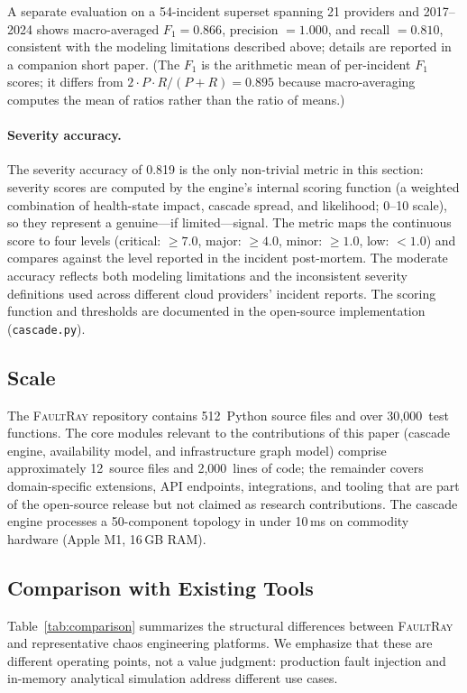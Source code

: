 \documentclass[10pt,twocolumn]{article}
\begin{document}
A separate evaluation on a 54-incident superset spanning 21 providers
and 2017--2024 shows macro-averaged $F_1 = 0.866$, precision $= 1.000$,
and recall $= 0.810$, consistent
with the modeling limitations described above; details are reported
in a companion short paper. (The $F_1$ is the arithmetic mean of
per-incident $F_1$ scores; it differs from
$2 \cdot P \cdot R / (P + R) = 0.895$ because macro-averaging
computes the mean of ratios rather than the ratio of means.)

\paragraph{Severity accuracy.}
The severity accuracy of 0.819 is the only non-trivial metric in
this section: severity scores are computed by the engine's internal
scoring function (a weighted combination of health-state impact,
cascade spread, and likelihood; 0--10 scale), so they represent
a genuine---if limited---signal. The metric maps the continuous score to four levels
(critical: $\ge 7.0$, major: $\ge 4.0$, minor: $\ge 1.0$,
low: $< 1.0$) and compares against the level reported in
the incident post-mortem. The moderate accuracy
reflects both modeling limitations and the inconsistent severity
definitions used across different cloud providers' incident
reports. The scoring function and thresholds are documented
in the open-source implementation (\texttt{cascade.py}).

\subsection{Scale}
The \textsc{FaultRay} repository contains 512~Python source files
and over 30{,}000~test functions. The core modules relevant to the
contributions of this paper (cascade engine, availability model,
and infrastructure graph model) comprise approximately 12~source
files and 2{,}000~lines of code; the remainder covers domain-specific
extensions, API endpoints, integrations, and tooling that are part
of the open-source release but not claimed as research contributions.
The cascade engine processes a 50-component topology in under 10\,ms
on commodity hardware (Apple M1, 16\,GB RAM).

\subsection{Comparison with Existing Tools}

Table~\ref{tab:comparison} summarizes the structural differences
between \textsc{FaultRay} and representative chaos engineering
platforms. We emphasize that these are different operating
points, not a value judgment: production fault injection and
in-memory analytical simulation address different use cases.
\end{document}
